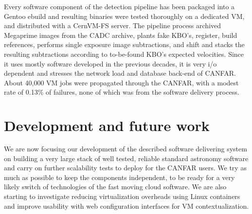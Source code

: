 Every software component of the detection pipeline has
been packaged into a Gentoo ebuild and resulting binaries were tested
thoroughly on a dedicated VM, and distributed with a CernVM-FS
server. The pipeline process archived Megaprime images from the CADC archive,
plants fake KBO's, register, build references, performs single
exposure image subtractions, and shift and stacks the resulting
subtractions according to to-be-found KBO's expected velocities. Since
it uses mostly software developed in the previous decades, it is very
i/o dependent and stresses the network load and database back-end of
CANFAR. About 40,000 VM jobs were propagated through the CANFAR, with
a modest rate of 0.13\% of failures, none of which was from the software
delivery process.

\section{Development and future work}
We are now focusing our development of the described software
delivering system on building a very large stack of well tested,
reliable standard astronomy software and carry on further scalability
tests to deploy for the CANFAR users. We try as much as possible to keep the components
independent, to be ready for a very likely switch of technologies of
the fast moving cloud software. We are also starting to investigate
reducing virtualization overheads using Linux containers and improve
usability with web configuration interfaces for VM contextualization.


